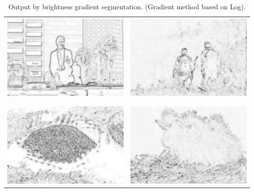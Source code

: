 \documentclass{article}
\begin{document}
\begin{center}
\begin{table}
\begin{tabular}{c| c}
\includegraphics[scale = 0.7]{log_1} & \includegraphics[scale = 0.7]{log_2}\\
\\\hline\\
\includegraphics[scale = 0.7]{log_3} & \includegraphics[scale = 0.7]{log_4}\\
\end{tabular}
\caption{Output by brightness gradient segmentation. (Gradient method based on Log).}
\label{table:4}
\end{table}
\end{center}
\end{document}

